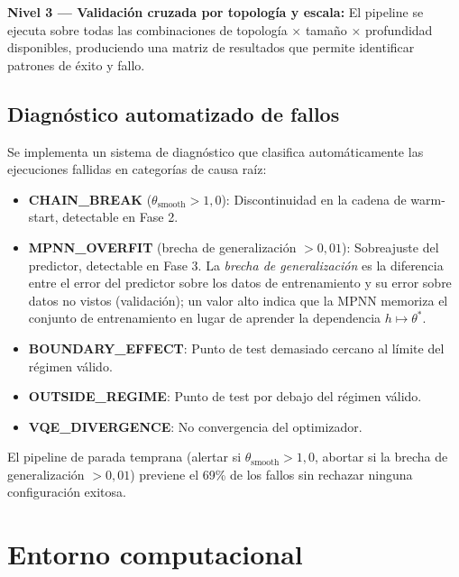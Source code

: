 \documentclass[11pt,a4paper,spanish]{book}
\begin{document}
\textbf{Nivel 3 --- Validación cruzada por topología y escala:} El pipeline se ejecuta sobre todas las combinaciones de topología $\times$ tamaño $\times$ profundidad disponibles, produciendo una matriz de resultados que permite identificar patrones de éxito y fallo.

\subsection{Diagnóstico automatizado de fallos}

Se implementa un sistema de diagnóstico que clasifica automáticamente las ejecuciones fallidas en categorías de causa raíz:

\begin{itemize}
    \item \textbf{CHAIN\_BREAK} ($\theta_{\text{smooth}} > 1,0$): Discontinuidad en la cadena de warm-start, detectable en Fase 2.
    \item \textbf{MPNN\_OVERFIT} (brecha de generalización $> 0,01$): Sobreajuste del predictor, detectable en Fase 3. La \emph{brecha de generalización} es la diferencia entre el error del predictor sobre los datos de entrenamiento y su error sobre datos no vistos (validación); un valor alto indica que la MPNN memoriza el conjunto de entrenamiento en lugar de aprender la dependencia $h \mapsto \theta^*$.
    \item \textbf{BOUNDARY\_EFFECT}: Punto de test demasiado cercano al límite del régimen válido.
    \item \textbf{OUTSIDE\_REGIME}: Punto de test por debajo del régimen válido.
    \item \textbf{VQE\_DIVERGENCE}: No convergencia del optimizador.
\end{itemize}

El pipeline de parada temprana (alertar si $\theta_{\text{smooth}} > 1,0$, abortar si la brecha de generalización $> 0,01$) previene el 69\% de los fallos sin rechazar ninguna configuración exitosa.

\section{Entorno computacional}
\end{document}
